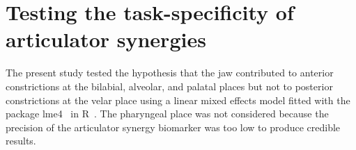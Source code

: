 \documentclass[preprint]{JASAnew}
\begin{document}
%
%
%
%
%




\section{Testing the task-specificity of articulator synergies}
\label{sec:taskspec}

The present study tested the hypothesis that the jaw contributed to anterior constrictions at the bilabial, alveolar, and palatal places but not to posterior constrictions at the velar place using a linear mixed effects model fitted with the package lme4~\citep{bates2015fitting} in R~\citep{r2017language}. 
%
The pharyngeal place was not considered because the precision of the articulator synergy biomarker was too low to produce credible results. 
\end{document}
